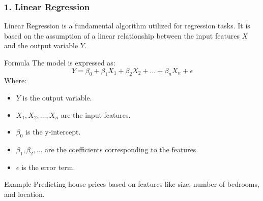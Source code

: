 \documentclass[aspectratio=169]{beamer}
\begin{document}
\begin{frame}[fragile]
    \frametitle{1. Linear Regression}
    Linear Regression is a fundamental algorithm utilized for regression tasks. It is based on the assumption of a linear relationship between the input features \(X\) and the output variable \(Y\).
    
    \begin{block}{Formula}
        The model is expressed as:
        \begin{equation}
            Y = \beta_0 + \beta_1 X_1 + \beta_2 X_2 + ... + \beta_n X_n + \epsilon
        \end{equation}
        Where:
        \begin{itemize}
            \item \(Y\) is the output variable.
            \item \(X_1, X_2, \ldots, X_n\) are the input features.
            \item \(\beta_0\) is the y-intercept.
            \item \(\beta_1, \beta_2, \ldots\) are the coefficients corresponding to the features.
            \item \(\epsilon\) is the error term.
        \end{itemize}
    \end{block}
    
    \begin{block}{Example}
        Predicting house prices based on features like size, number of bedrooms, and location.
    \end{block}
\end{frame}
\end{document}
